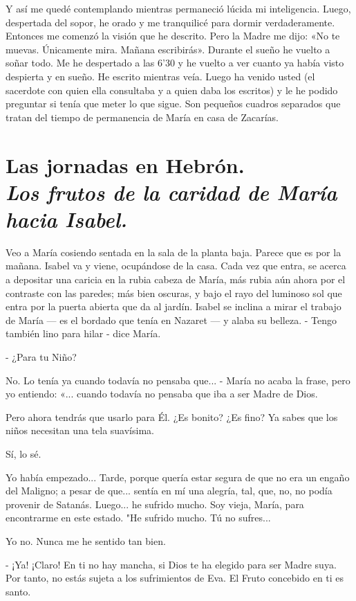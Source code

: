 \documentclass[12pt, twoside, openright]{book} %
\begin{document}
Y así me quedé contemplando mientras permaneció lúcida mi inteligencia. Luego, despertada del sopor, he orado y me tranquilicé para dormir verdaderamente. Entonces me comenzó la visión que he descrito. Pero la Madre me dijo: «No te muevas. Únicamente mira. Mañana escribirás». Durante el sueño he vuelto a soñar todo. Me he despertado a las 6'30 y he vuelto a ver cuanto ya había visto despierta y en sueño. He escrito mientras veía. Luego ha venido usted (el sacerdote con quien ella consultaba y a quien daba los escritos) y le he podido preguntar si tenía que meter lo que sigue. Son pequeños cuadros separados que tratan del tiempo de permanencia de María en casa de Zacarías. 

\chapter*{Las jornadas en Hebrón. \\ \normalfont\normalsize\textit{Los frutos de la caridad de María hacia Isabel.}}
 
Veo a María cosiendo sentada en la sala de la planta baja. Parece que es por la mañana. Isabel va y viene, ocupándose de la casa. Cada vez que entra, se acerca a depositar una caricia en la rubia cabeza de María, más rubia aún ahora por el contraste con las paredes; más bien oscuras, y bajo el rayo del luminoso sol que entra por la puerta abierta que da al jardín. Isabel se inclina a mirar el trabajo de María — es el bordado que tenía en Nazaret — y alaba su belleza. - Tengo también lino para hilar - dice María. 

- ¿Para tu Niño? 

No. Lo tenía ya cuando todavía no pensaba que... - María no acaba la frase, pero yo entiendo: «... cuando todavía no pensaba que iba a ser Madre de Dios. 

Pero ahora tendrás que usarlo para Él. ¿Es bonito? ¿Es fino? Ya sabes que los niños necesitan una tela suavísima. 

Sí, lo sé. 

Yo había empezado... Tarde, porque quería estar segura de que no era un engaño del Maligno; a pesar de que... sentía en mí una alegría, tal, que, no, no podía provenir de Satanás. Luego... he sufrido mucho. Soy vieja, María, para encontrarme en este estado. "He sufrido mucho. Tú no sufres... 

Yo no. Nunca me he sentido tan bien. 

- ¡Ya! ¡Claro! En ti no hay mancha, si Dios te ha elegido para ser Madre suya. Por tanto, no estás sujeta a los sufrimientos de Eva. El Fruto concebido en ti es santo. 
\end{document}
